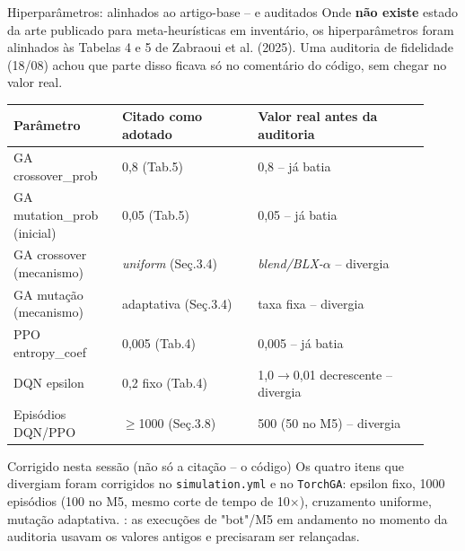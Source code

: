 \begin{frame}{Hiperparâmetros: alinhados ao artigo-base -- e auditados}
  \footnotesize Onde \textbf{não existe} estado da arte publicado para
  meta-heurísticas em inventário, os hiperparâmetros foram alinhados às
  Tabelas 4 e 5 de Zabraoui et al. (2025). Uma auditoria de fidelidade
  (18/08) achou que parte disso ficava só no comentário do código, sem
  chegar no valor real.

  \renewcommand{\arraystretch}{0.95}\scriptsize
  \begin{tabular}{@{}p{0.24\linewidth}p{0.30\linewidth}p{0.38\linewidth}@{}}
    \toprule
    \textbf{Parâmetro} & \textbf{Citado como adotado} & \textbf{Valor real antes da auditoria} \\
    \midrule
    GA crossover\_prob & 0,8 (Tab.5) & 0,8 -- \textcolor{aftergreen}{já batia} \\
    GA mutation\_prob (inicial) & 0,05 (Tab.5) & 0,05 -- \textcolor{aftergreen}{já batia} \\
    GA crossover (mecanismo) & \textit{uniform} (Seç.3.4) & \textit{blend/BLX-$\alpha$} -- \textcolor{beforered}{divergia} \\
    GA mutação (mecanismo) & adaptativa (Seç.3.4) & taxa fixa -- \textcolor{beforered}{divergia} \\
    PPO entropy\_coef & 0,005 (Tab.4) & 0,005 -- \textcolor{aftergreen}{já batia} \\
    DQN epsilon & 0,2 fixo (Tab.4) & 1,0$\to$0,01 decrescente -- \textcolor{beforered}{divergia} \\
    Episódios DQN/PPO & $\geq$1000 (Seç.3.8) & 500 (50 no M5) -- \textcolor{beforered}{divergia} \\
    \bottomrule
  \end{tabular}
  \vspace{0.4em}

  \begin{alertblock}{Corrigido nesta sessão (não só a citação -- o código)}
    \scriptsize Os quatro itens que divergiam foram corrigidos no
    \texttt{simulation.yml} e no \texttt{TorchGA}: epsilon fixo, 1000
    episódios (100 no M5, mesmo corte de tempo de 10$\times$), cruzamento
    uniforme, mutação adaptativa. : as execuções de
    "bot"/M5 em andamento no momento da auditoria usavam os valores
    antigos e precisaram ser relançadas.
  \end{alertblock}


\end{frame}
